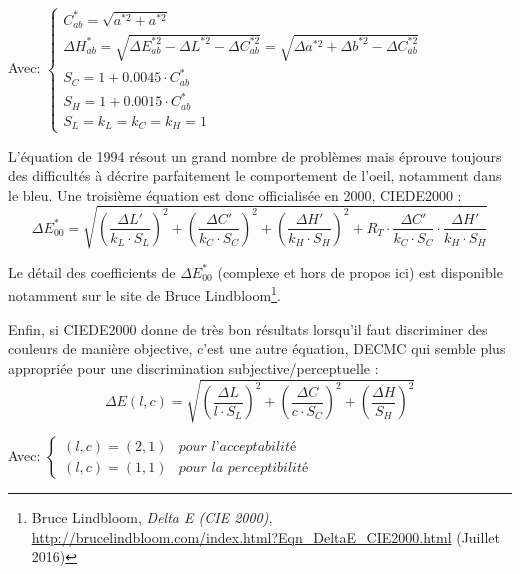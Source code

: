 	\par Avec:
	$\begin{cases}
	C^\ast_{ab} = \sqrt{a^{\ast 2} + a^{\ast 2}}\\
	\Delta H^\ast_{ab} = \sqrt{\Delta E^{\ast 2}_{ab} - \Delta L^{\ast 2} - \Delta C^{\ast 2}_{ab}} = \sqrt{\Delta a^{\ast 2} + \Delta b^{\ast 2} - \Delta C^{\ast 2}_{ab}}\\
	S_C = 1 + 0.0045 \cdot C^\ast_{ab}\\
	S_H = 1 + 0.0015 \cdot C^\ast_{ab}\\
	S_L = k_L = k_C = k_H = 1
	\end{cases}$
	
	\par L'équation de 1994 résout un grand nombre de problèmes mais éprouve toujours des difficultés à décrire parfaitement le comportement de l'oeil, notamment dans le bleu. Une troisième équation est donc officialisée en 2000, CIEDE2000 \citep{schanda_colorimetry:_2007, sharma_ciede2000_2005}:
	\begin{equation}
		\Delta E^\ast_{00} = \sqrt{\left(\frac{\Delta L'}{k_L \cdot S_L}\right)^2 + \left(\frac{\Delta C'}{k_C \cdot S_C}\right)^2 + \left(\frac{\Delta H'}{k_H \cdot S_H}\right)^2 + R_T \cdot \frac{\Delta C'}{k_C \cdot S_C} \cdot \frac{\Delta H'}{k_H \cdot S_H}}
		\label{eq:de_2000}
	\end{equation}
	
	\par Le détail des coefficients de $\Delta E^\ast_{00}$ (complexe et hors de propos ici) est disponible notamment sur le site de Bruce Lindbloom\footnote{Bruce Lindbloom, \textit{Delta E (CIE 2000)}, \url{http://brucelindbloom.com/index.html?Eqn_DeltaE_CIE2000.html} (Juillet 2016)}.

	\par Enfin, si CIEDE2000 donne de très bon résultats lorsqu'il faut discriminer des couleurs de manière objective, c'est une autre équation, DECMC qui semble plus appropriée pour une discrimination subjective/perceptuelle \citep{habekost_which_2013}:
	\begin{equation}
		\Delta E(l,c) = \sqrt{\left(\frac{\Delta L}{l \cdot S_L}\right)^2 + \left(\frac{\Delta C}{c \cdot S_C}\right)^2 + \left(\frac{\Delta H}{S_H}\right)^2}
		\label{eq:de_cmc}
	\end{equation}
	
	\par Avec:
	$\begin{cases}
	(l,c) = (2,1) & \textit{pour l'acceptabilité}\\
	(l,c) = (1,1) & \textit{pour la perceptibilité}
	\end{cases}$
	
